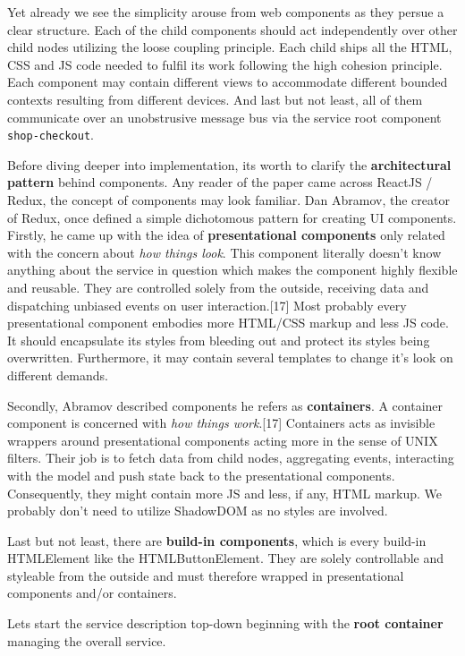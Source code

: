 \documentclass[]{article}
\begin{document}
Yet already we see the simplicity arouse from web components as they
persue a clear structure. Each of the child components should act
independently over other child nodes utilizing the loose coupling
principle. Each child ships all the HTML, CSS and JS code needed to
fulfil its work following the high cohesion principle. Each component
may contain different views to accommodate different bounded contexts
resulting from different devices. And last but not least, all of them
communicate over an unobstrusive message bus via the service root
component \texttt{shop-checkout}.

Before diving deeper into implementation, its worth to clarify the
\textbf{architectural pattern} behind components. Any reader of the
paper came across ReactJS / Redux, the concept of components may look
familiar. Dan Abramov, the creator of Redux, once defined a simple
dichotomous pattern for creating UI components. Firstly, he came up with
the idea of \textbf{presentational components} only related with the
concern about \emph{how things look}. This component literally doesn't
know anything about the service in question which makes the component
highly flexible and reusable. They are controlled solely from the
outside, receiving data and dispatching unbiased events on user
interaction.{[}17{]} Most probably every presentational component
embodies more HTML/CSS markup and less JS code. It should encapsulate
its styles from bleeding out and protect its styles being overwritten.
Furthermore, it may contain several templates to change it's look on
different demands.

Secondly, Abramov described components he refers as \textbf{containers}.
A container component is concerned with \emph{how things work}.{[}17{]}
Containers acts as invisible wrappers around presentational components
acting more in the sense of UNIX filters. Their job is to fetch data
from child nodes, aggregating events, interacting with the model and
push state back to the presentational components. Consequently, they
might contain more JS and less, if any, HTML markup. We probably don't
need to utilize ShadowDOM as no styles are involved.

Last but not least, there are \textbf{build-in components}, which is
every build-in HTMLElement like the HTMLButtonElement. They are solely
controllable and styleable from the outside and must therefore wrapped
in presentational components and/or containers.

Lets start the service description top-down beginning with the
\textbf{root container} managing the overall service.
\end{document}
